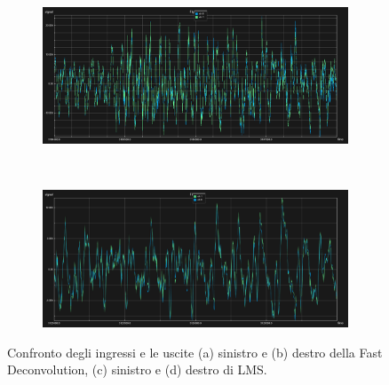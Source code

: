 \documentclass[12pt,a4paper,titlepage]{article}
\begin{document}
\begin{figure}[h]
	\ContinuedFloat
	\centering
	\begin{subfigure}{1\textwidth}
		\includegraphics[width=1\textwidth]{Immagini/d1_y1_LMS_nutech}
		\caption{}
		\label{fig:d1_y1_LMS_nutech}
	\end{subfigure}\\
	\begin{subfigure}{1\textwidth}
		\includegraphics[width=1\textwidth]{Immagini/d2_y2_LMS_nutech}
		\caption{}
		\label{fig:d2_y2_LMS_nutech}
	\end{subfigure}
		\caption{Confronto degli ingressi e le uscite (a) sinistro e (b) destro della Fast Deconvolution, (c) sinistro e (d) destro di LMS.}
		\label{fig:confronto_ingressi_uscita_LMS_nutech}
\end{figure}
\end{document}
